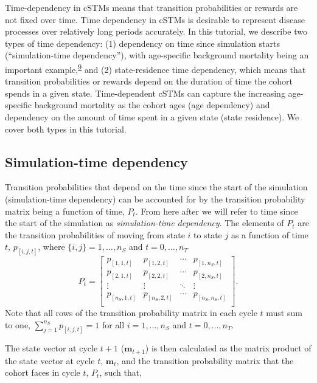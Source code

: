 \documentclass[
]{article}
\begin{document}
Time-dependency in cSTMs means that transition probabilities or rewards are not fixed over time. Time dependency in cSTMs is desirable to represent disease processes over relatively long periods accurately. In this tutorial, we describe two types of time dependency: (1) dependency on time since simulation starts (``simulation-time dependency''), with age-specific background mortality being an important example,\textsuperscript{\protect\hyperlink{ref-Snowsill2019}{9}} and (2) state-residence time dependency, which means that transition probabilities or rewards depend on the duration of time the cohort spends in a given state. Time-dependent cSTMs can capture the increasing age-specific background mortality as the cohort ages (age dependency) and dependency on the amount of time spent in a given state (state residence). We cover both types in this tutorial.

\hypertarget{simulation-time-dependency}{%
\subsection{Simulation-time dependency}\label{simulation-time-dependency}}

Transition probabilities that depend on the time since the start of the simulation (simulation-time dependency) can be accounted for by the transition probability matrix being a function of time, \(P_t\). From here after we will refer to time since the start of the simulation as \textit{simulation-time dependency}. The elements of \(P_t\) are the transition probabilities of moving from state \(i\) to state \(j\) as a function of time \(t\), \(p_{[i,j,t]}\), where \(\{i,j\} = 1,\ldots, n_S\) and \(t = 0,\ldots,n_T\)
\[
  P_t = 
  \begin{bmatrix}
    p_{[1,1,t]} & p_{[1,2,t]} & \cdots & p_{[1,n_S,t]} \\
    p_{[2,1,t]} & p_{[2,2,t]} & \cdots & p_{[2,n_S,t]} \\
    \vdots    & \vdots  & \ddots & \vdots   \\
    p_{[n_S,1,t]} & p_{[n_S,2,t]} & \cdots & p_{[n_S,n_S,t]} \\
  \end{bmatrix}.
\]
Note that all rows of the transition probability matrix in each cycle \(t\) must sum to one, \(\sum_{j=1}^{n_S}{p_{[i,j,t]}} = 1\) for all \(i = 1,\ldots,n_S\) and \(t = 0,\ldots, n_T\).

The state vector at cycle \(t+1\) (\(\mathbf{m}_{t+1}\)) is then calculated as the matrix product of the state vector at cycle \(t\), \(\mathbf{m}_{t}\), and the transition probability matrix that the cohort faces in cycle \(t\), \(P_t\), such that,
\end{document}
